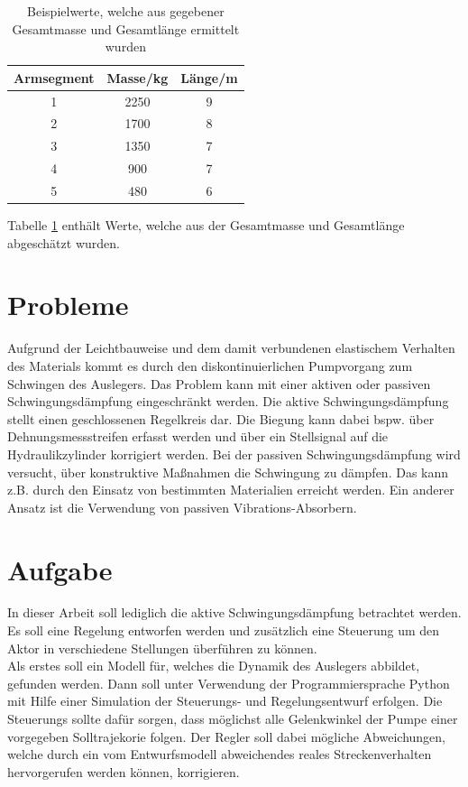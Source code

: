 \begin{table}[h!]
\centering
\begin{tabular}{c|c|c}
\rule[-1ex]{0pt}{2.5ex} Armsegment & Masse/kg & Länge/m \\ 
\hline \rule[-1ex]{0pt}{2.5ex} 1 & 2250 & 9 \\ 
\rule[-1ex]{0pt}{2.5ex} 2 & 1700 & 8 \\ 
\rule[-1ex]{0pt}{2.5ex} 3 & 1350 & 7 \\ 
\rule[-1ex]{0pt}{2.5ex} 4 & 900 & 7 \\ 
\rule[-1ex]{0pt}{2.5ex} 5 & 480 & 6 \\ 
\end{tabular} 
\caption{Beispielwerte, welche aus gegebener Gesamtmasse und Gesamtlänge ermittelt wurden}
\label{tab:WertePumpe}
\end{table}

Tabelle \ref{tab:WertePumpe} enthält Werte, welche aus der Gesamtmasse und Gesamtlänge abgeschätzt wurden.

\section{Probleme}
Aufgrund der Leichtbauweise und dem damit verbundenen elastischem Verhalten des Materials kommt es durch den diskontinuierlichen Pumpvorgang zum Schwingen des Auslegers. Das Problem kann mit einer aktiven oder passiven Schwingungsdämpfung eingeschränkt werden. Die aktive Schwingungsdämpfung stellt einen geschlossenen Regelkreis dar. Die Biegung kann dabei bspw. über Dehnungsmessstreifen erfasst werden und über ein Stellsignal auf die Hydraulikzylinder korrigiert werden. Bei der passiven Schwingungsdämpfung wird versucht, über konstruktive Maßnahmen die Schwingung zu dämpfen. Das kann z.B. durch den Einsatz von bestimmten Materialien erreicht werden. Ein anderer Ansatz ist die Verwendung von passiven Vibrations-Absorbern. 

\section{Aufgabe}
In dieser Arbeit soll lediglich die aktive Schwingungsdämpfung betrachtet werden. Es soll eine Regelung entworfen werden und zusätzlich eine Steuerung um den Aktor in verschiedene Stellungen überführen zu können. \\
Als erstes soll ein Modell für, welches die Dynamik des Auslegers abbildet, gefunden werden. Dann soll unter Verwendung der Programmiersprache Python mit Hilfe einer Simulation der Steuerungs- und Regelungsentwurf erfolgen. Die Steuerungs sollte dafür sorgen, dass möglichst alle Gelenkwinkel der Pumpe einer vorgegeben Solltrajekorie folgen. Der Regler soll dabei mögliche Abweichungen, welche durch ein vom Entwurfsmodell abweichendes reales Streckenverhalten hervorgerufen werden können, korrigieren. 


